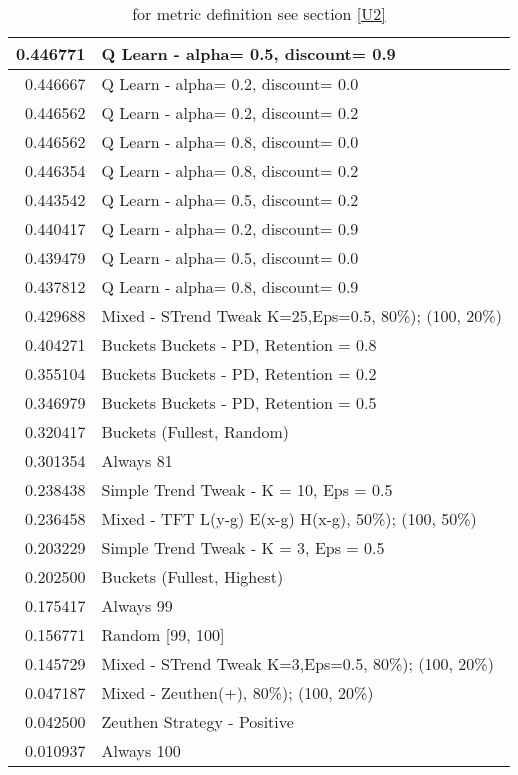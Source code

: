 \begin{table}[!hbtp]
\begin{footnotesize}
\begin{tabular}{|r|l|}
0.446771 & Q Learn - alpha= 0.5, discount= 0.9\\ \hline
0.446667 & Q Learn - alpha= 0.2, discount= 0.0\\ \hline
0.446562 & Q Learn - alpha= 0.2, discount= 0.2\\ \hline
0.446562 & Q Learn - alpha= 0.8, discount= 0.0\\ \hline
0.446354 & Q Learn - alpha= 0.8, discount= 0.2\\ \hline
0.443542 & Q Learn - alpha= 0.5, discount= 0.2\\ \hline
0.440417 & Q Learn - alpha= 0.2, discount= 0.9\\ \hline
0.439479 & Q Learn - alpha= 0.5, discount= 0.0\\ \hline
0.437812 & Q Learn - alpha= 0.8, discount= 0.9\\ \hline
0.429688 & Mixed - {STrend Tweak K=25,Eps=0.5, 80\%); (100, 20\%)}\\ \hline
0.404271 & Buckets Buckets - PD, Retention = 0.8\\ \hline
0.355104 & Buckets Buckets - PD, Retention = 0.2\\ \hline
0.346979 & Buckets Buckets - PD, Retention = 0.5\\ \hline
0.320417 & Buckets (Fullest, Random)\\ \hline
0.301354 & Always 81\\ \hline
0.238438 & Simple Trend Tweak - K = 10, Eps = 0.5\\ \hline
0.236458 & Mixed - {TFT L(y-g) E(x-g) H(x-g), 50\%); (100, 50\%)}\\ \hline
0.203229 & Simple Trend Tweak - K = 3, Eps = 0.5\\ \hline
0.202500 & Buckets (Fullest, Highest)\\ \hline
0.175417 & Always 99\\ \hline
0.156771 & Random [99, 100]\\ \hline
0.145729 & Mixed - {STrend Tweak K=3,Eps=0.5, 80\%); (100, 20\%)}\\ \hline
0.047187 & Mixed - {Zeuthen(+), 80\%); (100, 20\%)}\\ \hline
0.042500 & Zeuthen Strategy - Positive\\ \hline
0.010937 & Always 100\\ \hline
\end{tabular}
\caption{for metric definition see section \eqref{U2}}
\end{footnotesize}
\end{table}

